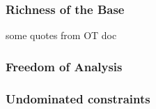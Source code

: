 

\subsubsection{Richness of the Base}

some quotes from OT doc
\citet{PE}
\citet{Bye2001}

\subsubsection{Freedom of Analysis}

\citet{Smolensky1996}
\citet{PE}

\subsubsection{Undominated constraints}

